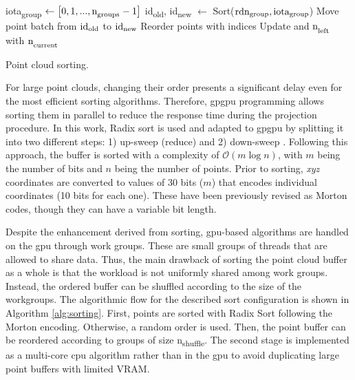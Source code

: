 \begin{algorithm}
\begin{algorithmic}[1]
                \State iota\textsubscript{group} $\gets \bigl[0, 1, ..., \textrm{n}_\textsubscript{groups}-1 \bigr]$ %
                \State id\textsubscript{old}, id\textsubscript{new} $\gets$ Sort($\textrm{rdn\textsubscript{group}}, \textrm{iota}\textsubscript{group}$) %
                    \State Move point batch from $\textrm{id}\textsubscript{old}$ to $\textrm{id}\textsubscript{new}$ %
                \EndFor
            \Else
                \State Reorder points with indices %
            \EndIf
        \EndProcedure
        \State Update \Points \Space and $\textrm{n}_\textsubscript{left}$ with $\textrm{n}_\textsubscript{current}$ %
    \EndWhile
    \caption{Point cloud sorting.}
    \label{alg:sorting}
  \end{algorithmic}
  \normalsize
\end{algorithm}

For large point clouds, changing their order presents a significant delay even for the most efficient sorting algorithms. Therefore, \acrshort{gpgpu} programming allows sorting them in parallel to reduce the response time during the projection procedure. In this work, Radix sort is used and adapted to \acrshort{gpgpu} by splitting it into two different steps: 1) up-sweep (reduce) and 2) down-sweep \cite{nguyen_gpu_2007}. Following this approach, the buffer is sorted with a complexity of $\mathcal{O}(m\log{}n)$, with $m$ being the number of bits and $n$ being the number of points. Prior to sorting, \textit{xyz} coordinates are converted to values of 30 bits ($m$) that encodes individual coordinates (10 bits for each one). These have been previously revised as Morton codes, though they can have a variable bit length.

Despite the enhancement derived from sorting, \acrshort{gpu}-based algorithms are handled on the \acrshort{gpu} through work groups. These are small groups of threads that are allowed to share data. Thus, the main drawback of sorting the point cloud buffer as a whole is that the workload is not uniformly shared among work groups. Instead, the ordered buffer can be shuffled according to the size of the workgroups. The algorithmic flow for the described sort configuration is shown in Algorithm \ref{alg:sorting}. First, points are sorted with Radix Sort following the Morton encoding. Otherwise, a random order is used. Then, the point buffer can be reordered according to groups of size n\textsubscript{shuffle}. The second stage is implemented as a multi-core \acrshort{cpu} algorithm rather than in the \acrshort{gpu} to avoid duplicating large point buffers with limited VRAM.

